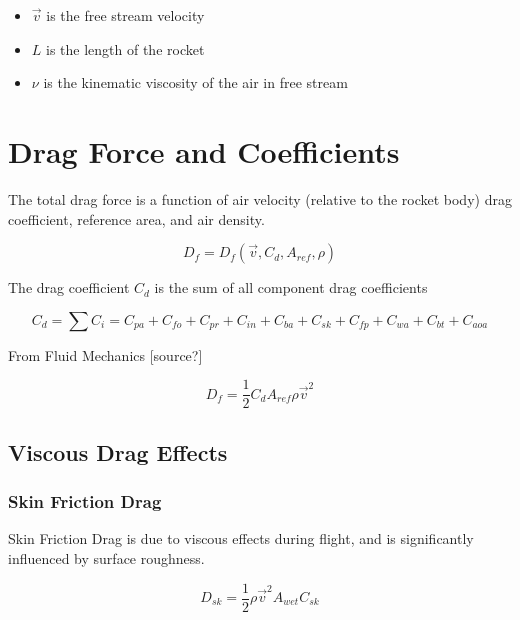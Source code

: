 \documentclass[]{book}
\providecommand{\tightlist}{%
  \setlength{\itemsep}{0pt}\setlength{\parskip}{0pt}}
\begin{document}
\begin{itemize}
\tightlist
\item
  \(\vec{v}\) is the free stream velocity
\item
  \(L\) is the length of the rocket
\item
  \(\nu\) is the kinematic viscosity of the air in free stream
\end{itemize}

\section{Drag Force and Coefficients}\label{drag-force-and-coefficients}

The total drag force is a function of air velocity (relative to the
rocket body) drag coefficient, reference area, and air density.

\begin{equation} 
D_f = D_f (\vec{v}, C_d, A_{ref}, \rho) 
\end{equation}

The drag coefficient \(C_d\) is the sum of all component drag
coefficients

\begin{equation} 
C_d = \sum C_i = C_{pa} + C_{fo} + C_{pr} + C_{in} + C_{ba} + C_{sk} + C_{fp} + C_{wa} + C_{bt} + C_{aoa}
\end{equation}

From Fluid Mechanics {[}source?{]}

\begin{equation}
D_f = \dfrac{1}{2} C_d A_{ref} \rho \vec{v}^2  
\end{equation}

\subsection{Viscous Drag Effects}\label{viscous-drag-effects}

\subsubsection{Skin Friction Drag}\label{skin-friction-drag}

Skin Friction Drag is due to viscous effects during flight, and is
significantly influenced by surface roughness.

\begin{equation}
\label{friction_drag_force}
D_{sk} = \dfrac{1}{2} \rho \vec{v}^2 A_{wet} C_{sk}
\end{equation}
\end{document}
